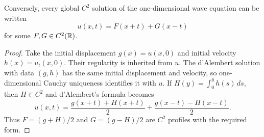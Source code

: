 \begin{theorem}
\label{thm:wave-1d-converse-representation}


Conversely, every global $C^2$ solution of the one-dimensional wave equation can
be written
$$u(x,t) = F(x+t) + G(x-t)$$
for some $F,G \in C^2(\mathbb{R})$.
\end{theorem}
\begin{proof}

Take the initial displacement $g(x)=u(x,0)$ and initial velocity $h(x)=u_t(x,0)$.
Their regularity is inherited from $u$. The d'Alembert solution with data $(g,h)$
has the same initial displacement and velocity, so one-dimensional Cauchy
uniqueness identifies it with $u$. If $H(y)=\int_0^y h(s)\,ds$, then $H\in C^2$
and d'Alembert's formula becomes
\[
u(x,t)=\frac{g(x+t)+H(x+t)}2+\frac{g(x-t)-H(x-t)}2.
\]
Thus $F=(g+H)/2$ and $G=(g-H)/2$ are $C^2$ profiles with the required form.
\end{proof}
